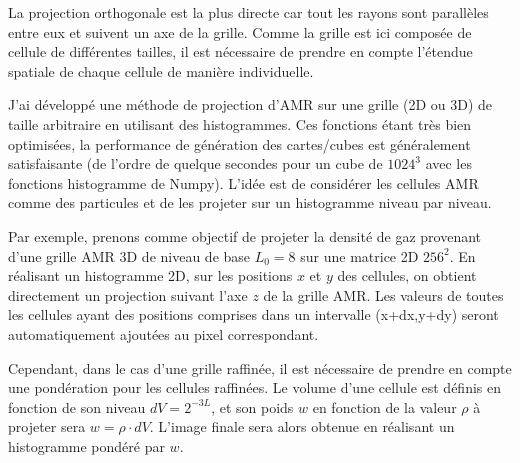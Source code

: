 La projection orthogonale est la plus directe car tout les rayons sont parallèles entre eux et suivent un axe de la grille.
Comme la grille est ici composée de cellule de différentes tailles, il est nécessaire de prendre en compte l'étendue spatiale de chaque cellule de manière individuelle.

J'ai développé une méthode de projection d'\ac{AMR} sur une grille (2D ou 3D) de taille arbitraire en utilisant des histogrammes.
Ces fonctions étant très bien optimisées, la performance de génération des cartes/cubes est généralement satisfaisante (de l'ordre de quelque secondes pour un cube de $1024^3$ avec les fonctions histogramme de Numpy).
L'idée est de considérer les cellules \ac{AMR} comme des particules et de les projeter sur un histogramme niveau par niveau.


Par exemple, prenons comme objectif de projeter la densité de gaz provenant d'une grille \ac{AMR} 3D de niveau de base $L_{0}=8$ sur une matrice 2D $256^2$.
En réalisant un histogramme 2D, sur les positions $x$ et $y$ des cellules, on obtient directement un projection suivant l'axe $z$ de la grille \ac{AMR}.
Les valeurs de toutes les cellules ayant des positions comprises dans un intervalle (x+dx,y+dy) seront automatiquement ajoutées au pixel correspondant.

Cependant, dans le cas d'une grille raffinée, il est nécessaire de prendre en compte une pondération pour les cellules raffinées.
Le volume d'une cellule est définis en fonction de son niveau $dV= 2^{-3L}$, et son poids $w$ en fonction de la valeur $\rho$ à projeter sera $w = \rho \cdot dV$.
L'image finale sera alors obtenue en réalisant un histogramme pondéré par $w$.





